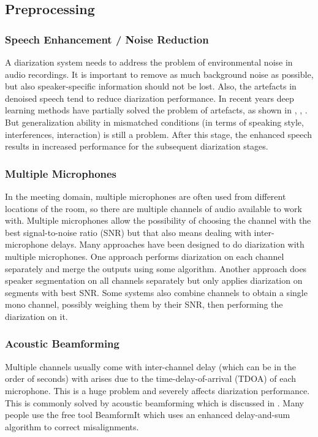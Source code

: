 	\subsection{Preprocessing}
		\subsubsection{Speech Enhancement / Noise Reduction}
		A diarization system needs to address the problem of environmental noise in audio recordings. It is important to remove as much background noise as possible, but also speaker-specific information should not be lost. Also, the artefacts in denoised speech tend to reduce diarization performance. In recent years deep learning methods have partially solved the problem of artefacts, as shown in \cite{6739096}, \cite{6639038}, \cite{6665000}. But generalization ability in mismatched conditions (in terms of speaking style, interferences, interaction) is still a problem. After this stage, the enhanced speech results in increased performance for the subsequent diarization stages. 
		
		\subsubsection{Multiple Microphones}
		In the meeting domain, multiple microphones are often used from different locations of the room, so there are multiple channels of audio available to work with. Multiple microphones allow the possibility of choosing the channel with the best signal-to-noise ratio (SNR) but that also means dealing with inter-microphone delays. Many approaches have been designed to do diarization with multiple microphones. One approach performs diarization on each channel separately and merge the outputs using some algorithm. Another approach does speaker segmentation on all channels separately but only applies diarization on segments with best SNR. Some systems also combine channels to obtain a single mono channel, possibly weighing them by their SNR, then performing the diarization on it.
		
		\subsubsection{Acoustic Beamforming}
		Multiple channels usually come with inter-channel delay (which can be in the order of seconds) with arises due to the time-delay-of-arrival (TDOA) of each microphone. This is a huge problem and severely affects diarization performance. This is commonly solved by acoustic beamforming which is discussed in \cite{anguera2007acoustic}. Many people use the free tool BeamformIt \cite{anguera2006beamformit} which uses an enhanced delay-and-sum algorithm to correct misalignments.

